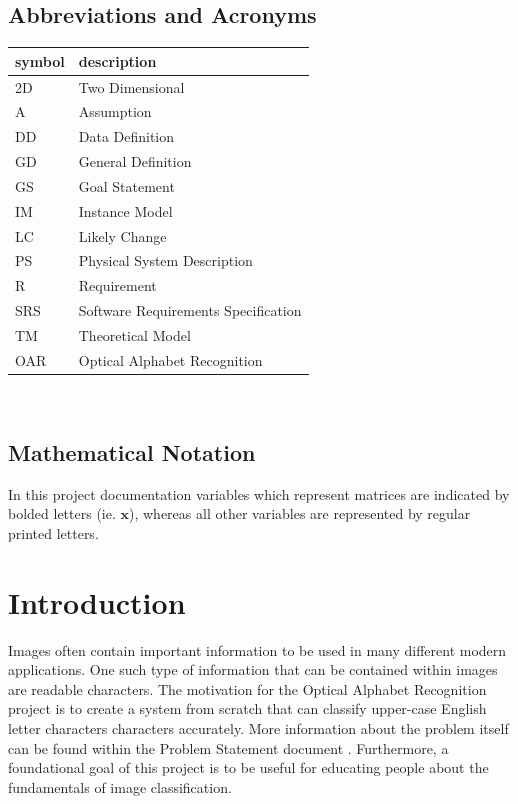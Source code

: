 \documentclass[12pt]{article}
\begin{document}
\subsection{Abbreviations and Acronyms}

\renewcommand{\arraystretch}{1.2}
\begin{tabular}{l l} 
  \toprule		
  \textbf{symbol} & \textbf{description}\\
  \midrule 
  2D & Two Dimensional\\
  A & Assumption\\
  DD & Data Definition\\
  GD & General Definition\\
  GS & Goal Statement\\
  IM & Instance Model\\
  LC & Likely Change\\
  PS & Physical System Description\\
  R & Requirement\\
  SRS & Software Requirements Specification\\
  TM & Theoretical Model\\
  OAR & Optical Alphabet Recognition\\
  \bottomrule
\end{tabular}\\

\subsection{Mathematical Notation}

In this project documentation variables which represent matrices are indicated by bolded letters (ie. $\mathbf{x}$), whereas
all other variables are represented by regular printed letters.


\newpage


\section{Introduction}

Images often contain important information to be used in many different modern applications. One such type 
of information that can be contained within images are readable characters. The motivation for the Optical Alphabet 
Recognition project is to create a system from scratch that can classify upper-case English letter characters characters accurately.
More information about the problem itself can be found within the Problem Statement document \citep{Prob_Statement}. Furthermore, a foundational goal of
this project is to be useful for educating people about the fundamentals of image classification.
\end{document}

